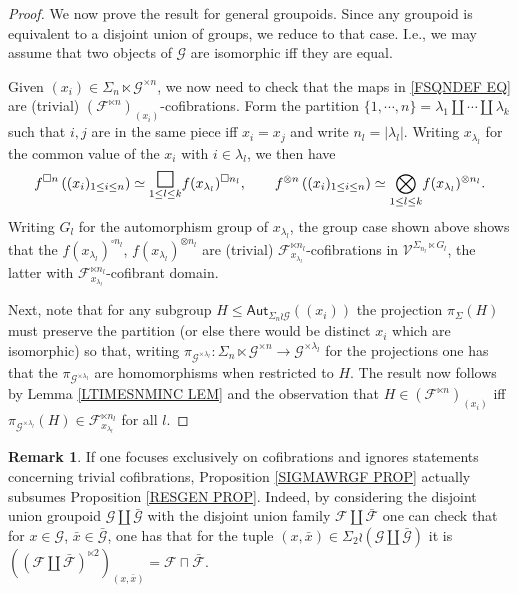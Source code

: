 \documentclass[a4paper,10pt
,draft
]{article}%
\numberwithin{equation}{section}
\numberwithin{figure}{section}
\theoremstyle{definition} %
\newtheorem{remark}[equation]{Remark}%
\newcommand{\F}{\ensuremath{\mathcal F}}
\newcommand{\V}{\ensuremath{\mathcal V}}
\newcommand{\G}{\ensuremath{\mathcal G}}
\newcommand{\1}{\ensuremath{\mathbbm 1}}%
\begin{document}
\begin{proof}
We now prove the result for general groupoids.
Since any groupoid is equivalent to a disjoint union of groups, 
we reduce to that case. I.e., we may assume that two objects of $\G$ are isomorphic iff they are equal.

Given $(x_i) \in \Sigma_n \ltimes \G^{\times n}$,
we now need to check that the maps in \eqref{FSQNDEF EQ}
are (trivial) $\left(\F^{\ltimes n}\right)_{(x_i)}$-cofibrations.
Form the partition 
$\{1,\cdots,n\} = \lambda_1 \amalg \cdots \amalg \lambda_k$
such that $i,j$ are in the same piece iff $x_i=x_j$ and write
$n_l = |\lambda_l|$.
Writing $x_{\lambda_l}$ for the common value of the $x_i$ with $i\in \lambda_l$, we then have
\[
f^{\square n}\left((x_i)_{1\leq i \leq n }\right)
\simeq
\underset{1\leq l \leq k}{\mathlarger{\mathlarger{\mathlarger{\square}}}} f(x_{\lambda_l})^{\square n_l},
\qquad
f^{\otimes n}\left((x_i)_{1\leq i \leq n }\right)
\simeq
\underset{1\leq l \leq k}{\bigotimes} f(x_{\lambda_l})^{\otimes n_l}.
\]
Writing $G_l$ for the automorphism group of $x_{\lambda_l}$,
the group case shown above shows that the
$f(x_{\lambda_l})^{\square n_l}$,
$f(x_{\lambda_l})^{\otimes n_l}$
are (trivial) $\F_{x_{\lambda_l}}^{\ltimes n_l}$-cofibrations
in $\V^{\Sigma_{n_l}\ltimes G_l}$,
the latter with 
$\F_{x_{\lambda_l}}^{\ltimes n_l}$-cofibrant domain.


Next, note that for any subgroup
$H \leq \mathsf{Aut}_{\Sigma_n \wr \G}((x_i))$ the projection 
$\pi_{\Sigma}(H)$ must preserve the partition 
(or else there would be distinct $x_i$ which are isomorphic) 
so that, writing 
$\pi_{\G^{\times \lambda_l}} \colon
\Sigma_n \ltimes \G^{\times n} \to \G^{\times \lambda_l}$
for the projections one has that the 
$\pi_{\G^{\times \lambda_l}}$ are homomorphisms when restricted to $H$. The result now follows by Lemma \ref{LTIMESNMINC LEM}
and the observation that
$H \in \left(\F^{\ltimes n}\right)_{(x_i)}$
iff
$\pi_{\G^{\times \lambda_l}}(H) \in \F_{x_{\lambda_l}}^{\ltimes n_l}$
for all $l$.
\end{proof}


\begin{remark}
If one focuses exclusively on cofibrations and ignores statements concerning trivial cofibrations,
Proposition \ref{SIGMAWRGF PROP} actually subsumes Proposition \ref{RESGEN PROP}. 
Indeed, by considering the disjoint union groupoid 
$\G \amalg \bar{\G}$
with the disjoint union family 
$\F \amalg \bar{\F}$
one can check that for
$x \in \G$, $\bar{x} \in \bar{\G}$,
one has that for the tuple $(x,\bar{x}) \in \Sigma_2 \wr (\G \amalg \bar{\G})$
it is
$\left(\left(\F \amalg \bar{\F}\right)^{\ltimes 2}\right)_{(x,\bar{x})} = \F \sqcap \bar{\F}$.
\end{remark}
\end{document}
